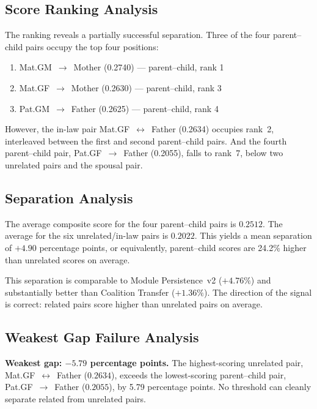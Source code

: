\documentclass{../yalumba}
\begin{document}
\subsection{Score Ranking Analysis}

The ranking reveals a partially successful separation.  Three of the four
parent--child pairs occupy the top four positions:

\begin{enumerate}
  \item Mat.GM~$\to$~Mother (0.2740) --- parent--child, rank 1
  \item Mat.GF~$\to$~Mother (0.2630) --- parent--child, rank 3
  \item Pat.GM~$\to$~Father (0.2625) --- parent--child, rank 4
\end{enumerate}

However, the in-law pair Mat.GF~$\leftrightarrow$~Father (0.2634) occupies
rank~2, interleaved between the first and second parent--child pairs.  And the
fourth parent--child pair, Pat.GF~$\to$~Father (0.2055), falls to rank~7,
below two unrelated pairs and the spousal pair.


\subsection{Separation Analysis}

\begin{keyfinding}
The average composite score for the four parent--child pairs is $0.2512$.
The average for the six unrelated/in-law pairs is $0.2022$.
This yields a mean separation of $+4.90$ percentage points, or equivalently,
parent--child scores are 24.2\% higher than unrelated scores on average.
\end{keyfinding}

This separation is comparable to Module Persistence~v2 ($+4.76\%$) and
substantially better than Coalition Transfer ($+1.36\%$).  The direction of
the signal is correct: related pairs score higher than unrelated pairs on
average.

\subsection{Weakest Gap Failure Analysis}

\begin{limitation}
\textbf{Weakest gap: $-5.79$ percentage points.}  The highest-scoring
unrelated pair, Mat.GF~$\leftrightarrow$~Father ($0.2634$), exceeds the
lowest-scoring parent--child pair, Pat.GF~$\to$~Father ($0.2055$), by 5.79
percentage points.  No threshold can cleanly separate related from unrelated
pairs.
\end{limitation}
\end{document}
